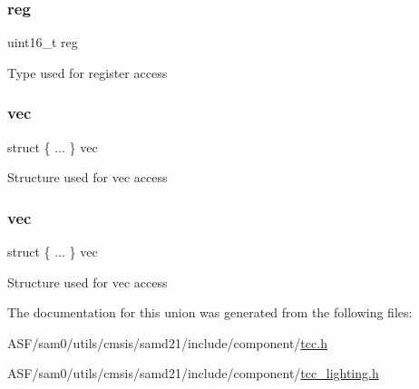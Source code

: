 \subsubsection{\texorpdfstring{reg}{reg}}
{\footnotesize\ttfamily uint16\+\_\+t reg}

Type used for register access \mbox{\label{union_t_c_c___p_a_t_t_b___type_a90e3422c4ca25773161a5365185636b0}} 
\subsubsection{\texorpdfstring{vec}{vec}\hspace{0.1cm}{\footnotesize\ttfamily [1/2]}}
{\footnotesize\ttfamily struct \{ ... \}   vec}

Structure used for vec access \mbox{\label{union_t_c_c___p_a_t_t_b___type_a555508daa5f90b027cdab60580681144}} 
\subsubsection{\texorpdfstring{vec}{vec}\hspace{0.1cm}{\footnotesize\ttfamily [2/2]}}
{\footnotesize\ttfamily struct \{ ... \}   vec}

Structure used for vec access 

The documentation for this union was generated from the following files\+:\begin{DoxyCompactItemize}
\item 
A\+S\+F/sam0/utils/cmsis/samd21/include/component/\mbox{\hyperlink{tcc_8h}{tcc.\+h}}\item 
A\+S\+F/sam0/utils/cmsis/samd21/include/component/\mbox{\hyperlink{tcc__lighting_8h}{tcc\+\_\+lighting.\+h}}\end{DoxyCompactItemize}
